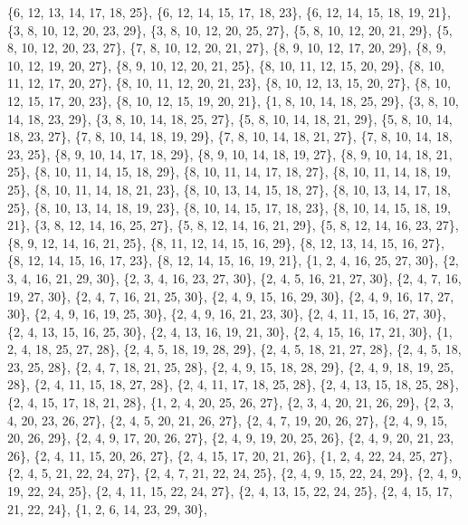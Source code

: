 \documentclass[11pt,a4paper]{article}
\begin{document}
{\{6, 12, 13, 14, 17, 18, 25\}, \{6, 12, 14, 15, 17, 18, 23\}, \{6, 12, 14, 15, 18, 19, 21\}, \{3, 8, 10, 12, 20, 23, 29\}, \{3, 8, 10, 12, 20, 25, 27\},
\{5, 8, 10, 12, 20, 21, 29\}, \{5, 8, 10, 12, 20, 23, 27\}, \{7, 8, 10, 12, 20, 21, 27\}, \{8, 9, 10, 12, 17, 20, 29\}, \{8, 9, 10, 12, 19, 20, 27\},
\{8, 9, 10, 12, 20, 21, 25\}, \{8, 10, 11, 12, 15, 20, 29\}, \{8, 10, 11, 12, 17, 20, 27\}, \{8, 10, 11, 12, 20, 21, 23\}, \{8, 10, 12, 13, 15, 20, 27\},
\{8, 10, 12, 15, 17, 20, 23\}, \{8, 10, 12, 15, 19, 20, 21\}, \{1, 8, 10, 14, 18, 25, 29\}, \{3, 8, 10, 14, 18, 23, 29\}, \{3, 8, 10, 14, 18, 25, 27\},
\{5, 8, 10, 14, 18, 21, 29\}, \{5, 8, 10, 14, 18, 23, 27\}, \{7, 8, 10, 14, 18, 19, 29\}, \{7, 8, 10, 14, 18, 21, 27\}, \{7, 8, 10, 14, 18, 23, 25\},
\{8, 9, 10, 14, 17, 18, 29\}, \{8, 9, 10, 14, 18, 19, 27\}, \{8, 9, 10, 14, 18, 21, 25\}, \{8, 10, 11, 14, 15, 18, 29\}, \{8, 10, 11, 14, 17, 18, 27\},
\{8, 10, 11, 14, 18, 19, 25\}, \{8, 10, 11, 14, 18, 21, 23\}, \{8, 10, 13, 14, 15, 18, 27\}, \{8, 10, 13, 14, 17, 18, 25\}, \{8, 10, 13, 14, 18, 19, 23\},
\{8, 10, 14, 15, 17, 18, 23\}, \{8, 10, 14, 15, 18, 19, 21\}, \{3, 8, 12, 14, 16, 25, 27\}, \{5, 8, 12, 14, 16, 21, 29\}, \{5, 8, 12, 14, 16, 23, 27\},
\{8, 9, 12, 14, 16, 21, 25\}, \{8, 11, 12, 14, 15, 16, 29\}, \{8, 12, 13, 14, 15, 16, 27\}, \{8, 12, 14, 15, 16, 17, 23\}, \{8, 12, 14, 15, 16, 19, 21\},
\{1, 2, 4, 16, 25, 27, 30\}, \{2, 3, 4, 16, 21, 29, 30\}, \{2, 3, 4, 16, 23, 27, 30\}, \{2, 4, 5, 16, 21, 27, 30\}, \{2, 4, 7, 16, 19, 27, 30\},
\{2, 4, 7, 16, 21, 25, 30\}, \{2, 4, 9, 15, 16, 29, 30\}, \{2, 4, 9, 16, 17, 27, 30\}, \{2, 4, 9, 16, 19, 25, 30\}, \{2, 4, 9, 16, 21, 23, 30\},
\{2, 4, 11, 15, 16, 27, 30\}, \{2, 4, 13, 15, 16, 25, 30\}, \{2, 4, 13, 16, 19, 21, 30\}, \{2, 4, 15, 16, 17, 21, 30\}, \{1, 2, 4, 18, 25, 27, 28\},
\{2, 4, 5, 18, 19, 28, 29\}, \{2, 4, 5, 18, 21, 27, 28\}, \{2, 4, 5, 18, 23, 25, 28\}, \{2, 4, 7, 18, 21, 25, 28\}, \{2, 4, 9, 15, 18, 28, 29\},
\{2, 4, 9, 18, 19, 25, 28\}, \{2, 4, 11, 15, 18, 27, 28\}, \{2, 4, 11, 17, 18, 25, 28\}, \{2, 4, 13, 15, 18, 25, 28\}, \{2, 4, 15, 17, 18, 21, 28\},
\{1, 2, 4, 20, 25, 26, 27\}, \{2, 3, 4, 20, 21, 26, 29\}, \{2, 3, 4, 20, 23, 26, 27\}, \{2, 4, 5, 20, 21, 26, 27\}, \{2, 4, 7, 19, 20, 26, 27\},
\{2, 4, 9, 15, 20, 26, 29\}, \{2, 4, 9, 17, 20, 26, 27\}, \{2, 4, 9, 19, 20, 25, 26\}, \{2, 4, 9, 20, 21, 23, 26\}, \{2, 4, 11, 15, 20, 26, 27\},
\{2, 4, 15, 17, 20, 21, 26\}, \{1, 2, 4, 22, 24, 25, 27\}, \{2, 4, 5, 21, 22, 24, 27\}, \{2, 4, 7, 21, 22, 24, 25\}, \{2, 4, 9, 15, 22, 24, 29\},
\{2, 4, 9, 19, 22, 24, 25\}, \{2, 4, 11, 15, 22, 24, 27\}, \{2, 4, 13, 15, 22, 24, 25\}, \{2, 4, 15, 17, 21, 22, 24\}, \{1, 2, 6, 14, 23, 29, 30\},
}
\end{document}
